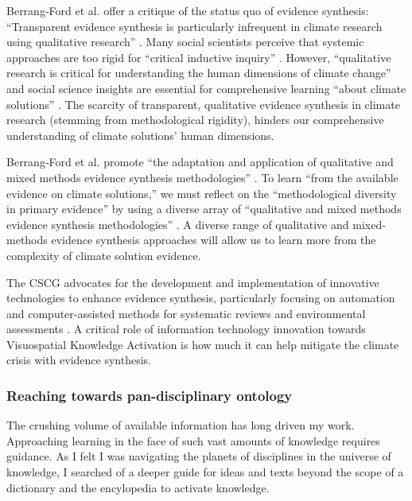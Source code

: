 Berrang‐Ford et al. offer a critique of the status quo of evidence synthesis: “Transparent evidence synthesis is particularly infrequent in climate research using qualitative research” \citep[p. 1]{berrangford_editorial_2020}. Many social scientists  perceive that systemic approaches are too rigid for “critical inductive inquiry” \citep[p. 1]{berrangford_editorial_2020}. However, “qualitative research is critical for understanding the human dimensions of climate change” and social science insights are essential for comprehensive learning “about climate solutions” \citep[p. 1]{berrangford_editorial_2020}.  The scarcity of transparent, qualitative evidence synthesis in climate research (stemming from methodological rigidity), hinders our comprehensive understanding of climate solutions’ human dimensions.

Berrang‐Ford et al. promote “the adaptation and application of qualitative and mixed methods evidence synthesis methodologies” \citep[p. 3]{berrangford_editorial_2020}. To learn “from the available evidence on climate solutions,” we must reflect on the “methodological diversity in primary evidence” by using a diverse array of “qualitative and mixed methods evidence synthesis methodologies” \citep[p. 3]{berrangford_editorial_2020}. A diverse range of qualitative and mixed-methods evidence synthesis approaches will allow us to learn more from the complexity of climate solution evidence.

The CSCG advocates for the development and implementation of innovative technologies to enhance evidence synthesis, particularly focusing on automation and computer-assisted methods for systematic reviews and environmental assessments \citep[p. 3]{berrangford_editorial_2020}. A critical role of information technology innovation towards Visuospatial Knowledge Activation is how much it can help mitigate the climate crisis with evidence synthesis.
  

\subsubsection{Reaching towards pan-disciplinary ontology}
The crushing volume of available information has long driven my work. Approaching learning in the face of such vast amounts of knowledge requires guidance. As I felt I was navigating the planets of disciplines in the universe of knowledge, I searched of a deeper guide for ideas and texts beyond the scope of a dictionary and the encylopedia to activate knowledge. 

